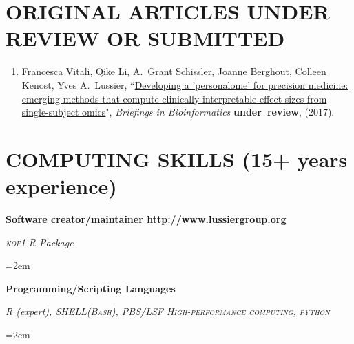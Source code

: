 \documentclass[paper=a4,fontsize=11pt]{scrartcl} %
\newcommand{\NewPart}[2]{\section*{\uppercase{#1} #2 }}
\newcommand{\EducationEntry}[4]{
		\noindent \textbf{#1} \hfill      %
		\colorbox{White}{%
			\parbox{6em}{%
			\hfill\color{Black}#2}} \par  %
		\noindent \textit{#3} \par        %
		\noindent\hangindent=2em\hangafter=0 \small #4 %
		\normalsize \par \vspace{-7pt}}
\newcommand{\PaperEntry}[7]{
		\noindent #1, ``\href{#7}{#2}", \textit{#3} \textbf{#4}, #5 (#6).}
\begin{document}
\NewPart{Original articles under review or submitted}{}
\vspace{-7pt}
\begin{enumerate}


\item \PaperEntry{Francesca Vitali, Qike Li, \underline{A.~Grant Schissler}, Joanne Berghout, Colleen Kenost, Yves A.~Lussier}{Developing a 'personalome' for precision medicine: emerging methods that compute clinically interpretable effect sizes from single-subject omics}{Briefings in Bioinformatics}{under~review}{}{2017}{}

\end{enumerate}





\NewPart{Computing Skills}{(15+ years experience)}
\vspace{-7pt}
\EducationEntry{Software creator/maintainer \href{http://www.lussiergroup.org/publications/N-of-1-pathways}{http://www.lussiergroup.org}}{}{\textsc{nof1} R Package}{}

\EducationEntry{Programming/Scripting Languages}{}{\textsc{R }(expert), \textsc{SHELL(Bash), PBS/LSF High-performance computing, python}}{}
\end{document}
